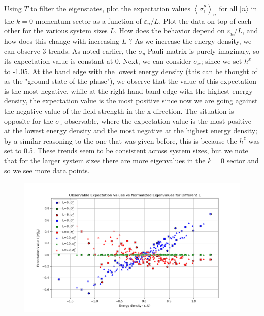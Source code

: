 \documentclass[12pt]{article}
\begin{document}
Using $T$ to filter the eigenstates, plot the expectation values $\left\langle\sigma_{1}^{\mu}\right\rangle_{n}$ for all $|n\rangle$ in the $k=0$ momentum sector as a function of $\varepsilon_{n} / L$. Plot the data on top of each other for the various system sizes $L$. How does the behavior depend on $\varepsilon_{n} / L$, and how does this change with increasing $L$ ?
\newpage
As we increase the energy density, we can observe 3 trends. As noted earlier, the $\sigma_y$ Pauli matrix is purely imaginary, so its expectation value is constant at 0. Next, we can consider $\sigma_x$; since we set $h^x$ to -1.05. At the band edge with the lowest energy density (this can be thought of as the "ground state of the phase"), we observe that the value of this expectation is the most negative, while at the right-hand band edge with the highest energy density, the expectation value is the most positive since now we are going against the negative value of the field strength in the x direction. The situation is opposite for the $\sigma_z$ observable, where the expectation value is the most positive at the lowest energy density and the most negative at the highest energy density; by a similar reasoning to the one that was given before, this is because the $h^z$ was set to 0.5. These trends seem to be consistent across system sizes, but we note that for the larger system sizes there are more eigenvalues in the $k=0$ sector and so we see more data points. 
\begin{figure}
\centering
\includegraphics[width=\textwidth]{p4_2_1_filtered_expectations.png}
\end{figure}
\end{document}
